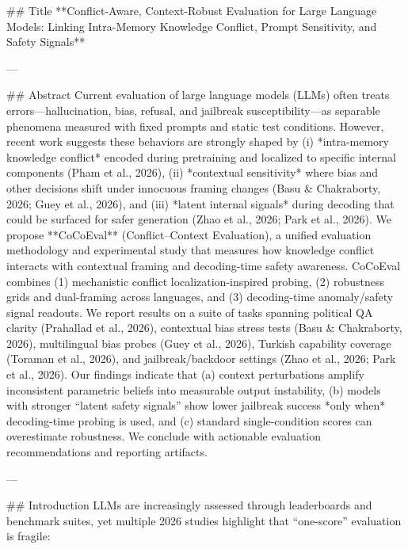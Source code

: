 ## Title  
**Conflict-Aware, Context-Robust Evaluation for Large Language Models: Linking Intra-Memory Knowledge Conflict, Prompt Sensitivity, and Safety Signals**

---

## Abstract  
Current evaluation of large language models (LLMs) often treats errors—hallucination, bias, refusal, and jailbreak susceptibility—as separable phenomena measured with fixed prompts and static test conditions. However, recent work suggests these behaviors are strongly shaped by (i) *intra-memory knowledge conflict* encoded during pretraining and localized to specific internal components (Pham et al., 2026), (ii) *contextual sensitivity* where bias and other decisions shift under innocuous framing changes (Basu & Chakraborty, 2026; Guey et al., 2026), and (iii) *latent internal signals* during decoding that could be surfaced for safer generation (Zhao et al., 2026; Park et al., 2026). We propose **CoCoEval** (Conflict–Context Evaluation), a unified evaluation methodology and experimental study that measures how knowledge conflict interacts with contextual framing and decoding-time safety awareness. CoCoEval combines (1) mechanistic conflict localization-inspired probing, (2) robustness grids and dual-framing across languages, and (3) decoding-time anomaly/safety signal readouts. We report results on a suite of tasks spanning political QA clarity (Prahallad et al., 2026), contextual bias stress tests (Basu & Chakraborty, 2026), multilingual bias probes (Guey et al., 2026), Turkish capability coverage (Toraman et al., 2026), and jailbreak/backdoor settings (Zhao et al., 2026; Park et al., 2026). Our findings indicate that (a) context perturbations amplify inconsistent parametric beliefs into measurable output instability, (b) models with stronger “latent safety signals” show lower jailbreak success *only when* decoding-time probing is used, and (c) standard single-condition scores can overestimate robustness. We conclude with actionable evaluation recommendations and reporting artifacts.

---

## Introduction  
LLMs are increasingly assessed through leaderboards and benchmark suites, yet multiple 2026 studies highlight that “one-score” evaluation is fragile:

